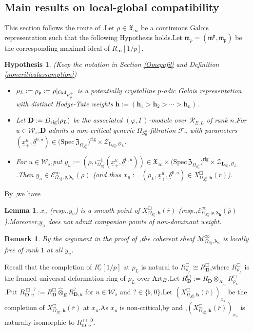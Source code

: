 \documentclass[10pt]{article}
\newtheorem{lem}[thm]{Lemma}
\newtheorem{hypothesis}[thm]{Hypothesis}
\newtheorem{rmk}[thm]{Remark}
\newcommand{\rig}{{\rm rig}}
\newcommand{\gal}{{\rm Gal}}
\newcommand{\Art}{{\rm Art}}
\newcommand{\hpi}{{{\mathbf{h}}}}
\newcommand{\Dpik}{{\mathbf{D}}}
\newcommand{\sbanpiku}{{\big(\mathrm{Spec}\hspace{2pt}\FZ_{\Omega_{S^u_0}}\big)^{\mathrm{rig}}}}
\newcommand{\rigchu}{{\mathcal{Z}_{\bL_{S^u_0},\mathcal{O}_L}}}
\newcommand{\omepik}{\Omega_{S^u_0}}
\newcommand{\defvaru}{{X^\Box_{\omepik,\mathbf{{h}}}(\overline{r})}}
\newcommand{\bL}{{\mathbf{L}}}
\newcommand{\bh}{{\mathbf{h}}}
\newcommand{\cR}{\mathcal R}
\newcommand{\cM}{\mathcal M}
\newcommand{\cF}{\mathcal F}
\newcommand{\FX}{{\mathfrak{X}}}
\newcommand{\FZ}{{\mathfrak{Z}}}
\newcommand{\fm}{{\mathfrak{m}}}
\newcommand{\fp}{{\mathfrak{p}}}
\newcommand{\sW}{\mathscr W}
\begin{document}
\subsection{Main results on local-global compatibility}

This section follows the route of \cite[Section 4.1]{ParaDing2024}.\;Let $\rho\in \FX_{\infty}$ be a continuous Galois representation such that  the  following Hypothesis holds.\;Let $\fm_{\rho}=(\fm^{\fp},\fm_{\fp})$ be  the corresponding maximal ideal of $R_{\infty}[1/p]$.\;
\begin{hypothesis}\label{hyongaloisrep1}(Keep the notation in  Section \ref{Omegafil} and Definition \ref{noncriticalassumption})
	\begin{itemize}
		\item[(a)] $\rho_L:=\rho_{\fp}:=\rho|_{\gal_{F^+_{\fp}}}$ is a potentially crystalline  $p$-adic Galois representation with distinct Hodge-Tate weights $\bh:=(\hpi_{1}>\hpi_{2}>\cdots>\hpi_{n} )$.\;
		\item[(b)] Let $\Dpik:=D_{\rig}(\rho_L)$ be the associated $(\varphi,\Gamma)$-module over $\cR_{E,L}$ of rank $n$.\;For  $u\in \sW_s$,\;$\Dpik$ admits a non-critical generic $\omepik$-filtration $\cF_u$ with parameters  $(\underline{x}^u_+,\underline{\delta}^{0,u})\in \sbanpiku\times \rigchu$.\;
		\item[(c)] For $u\in \sW_s$,\;put $y_{u}:=(\rho,\iota^{-1}_{\omepik}(\underline{x}^u_+,\underline{\delta}^{0,u}))\in \FX_{\infty}\times\sbanpiku\times \rigchu$.\;Then $y_u\in \mathcal{E}_{\omepik,\fp,{\bm\lambda}_\bh}^\infty(\overline{\rho})$ (and thus $x_u:=(\rho_L,\underline{x}^u_+,\underline{\delta}^{0,u})\in \defvaru$).\;
	\end{itemize}
\end{hypothesis}

By \cite[Propositions 4.10 $\&$ 4.11]{He20222},\;we have 
\begin{lem}
$x_u$ (resp.,\;$y_{u}$) is a smooth point of $\defvaru$ (resp.,\;$\mathcal{E}_{\omepik,\fp,{\bm\lambda}_\bh}^\infty(\overline{\rho})$).\;Moreover,\;$y_{u}$ does not admit companion points of non-dominant weight.\;
\end{lem}
\begin{rmk}
By the argument in the proof of \cite[Theorem 4.35]{PATCHING2016},\;the coherent sheaf $\cM_{\omepik,{\bm\lambda}_\bh}^{\infty}$ is locally free of rank $1$ at all $y_{u}$.\;
\end{rmk}



Recall that the completion of $R_{\overline{r}}^{\square}[1/p]$ at $\rho_L$ is natural to $R^{\Box}_{\rho_L}\cong R^{\Box}_{\Dpik}$,\;where $R^{\Box}_{\rho_L}$ is the framed universal deformation ring of $\rho_L$ over $\Art_E$.\;Let $R^{\Box}_{\Dpik}:=R_{\Dpik}\otimes_{R_{\rho_L}}R^{\Box}_{\rho_L}$.\;Put $R_{\Dpik,u}^{\Box,?}:=R_{\Dpik}^{\Box}\widehat{\otimes}_ER^{?}_{\Dpik,u}$ for $u\in \sW_{s}$ and $?\in\{\flat,0\}$.\;Let $(\defvaru)^{\widehat{}}_{x_u}$ be the completion of $\defvaru$ at $x_u$.\;As $x_u$ is non-critical,\;by \cite[Proposition 6.4.5]{Ding2021} and \cite[Proposition 4.9]{He20222},\;$(\defvaru)^{\widehat{}}_{x_u}$ is naturally isomorphic to $R_{\Dpik,u}^{\Box,0}$.\;
\end{document}
